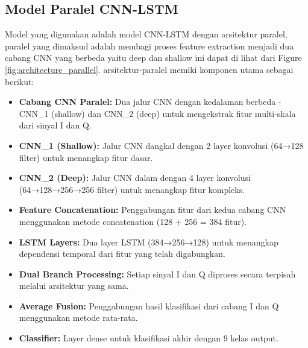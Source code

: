 \documentclass{article}
\begin{document}
\newpage 
\subsection{Model Paralel CNN-LSTM}
Model yang digunakan adalah model CNN-LSTM dengan arsitektur paralel, paralel yang dimaksud adalah membagi proses feature extraction menjadi dua cabang CNN yang berbeda 
yaitu deep dan shallow ini dapat di lihat dari Figure \ref{fig:architecture_parallel}. arsitektur-paralel memiki komponen utama sebagai berikut:

\begin{itemize}
    \item \textbf{Cabang CNN Paralel:} Dua jalur CNN dengan kedalaman berbeda - CNN\_1 (shallow) dan CNN\_2 (deep) untuk mengekstrak fitur multi-skala dari sinyal I dan Q.
    \item \textbf{CNN\_1 (Shallow):} Jalur CNN dangkal dengan 2 layer konvolusi (64→128 filter) untuk menangkap fitur dasar.
    \item \textbf{CNN\_2 (Deep):} Jalur CNN dalam dengan 4 layer konvolusi (64→128→256→256 filter) untuk menangkap fitur kompleks.
    \item \textbf{Feature Concatenation:} Penggabungan fitur dari kedua cabang CNN menggunakan metode concatenation (128 + 256 = 384 fitur).
    \item \textbf{LSTM Layers:} Dua layer LSTM (384→256→128) untuk menangkap dependensi temporal dari fitur yang telah digabungkan.
    \item \textbf{Dual Branch Processing:} Setiap sinyal I dan Q diproses secara terpisah melalui arsitektur yang sama.
    \item \textbf{Average Fusion:} Penggabungan hasil klasifikasi dari cabang I dan Q menggunakan metode rata-rata.
    \item \textbf{Classifier:} Layer dense untuk klasifikasi akhir dengan 9 kelas output.
\end{itemize}
\end{document}
